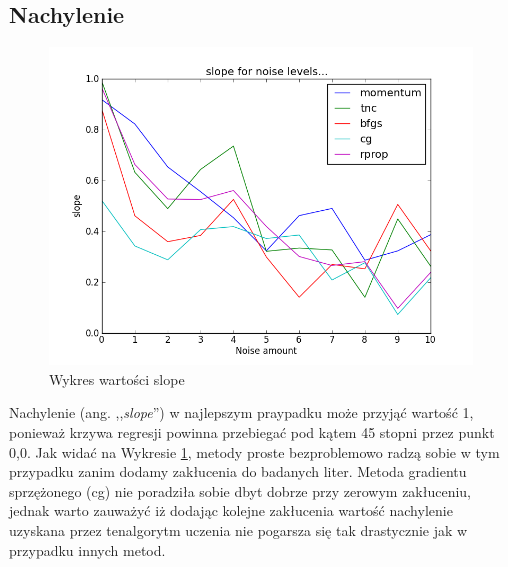 \documentclass[a4paper]{article}
\begin{document}
\subsection{Nachylenie}
\begin{figure}[pht]
 \centering
 \includegraphics[scale=0.5]{../compare_plots/compare_plot_slope}
 \caption{Wykres wartości slope}\label{rys:plot1}
\end{figure}
Nachylenie (ang. ,,\textit{slope}'') w najlepszym praypadku może przyjąć wartość 1, ponieważ krzywa regresji 
powinna przebiegać pod kątem 45 stopni przez punkt 0,0. Jak widać na Wykresie \ref{rys:plot1},
metody proste bezproblemowo radzą sobie w tym przypadku zanim dodamy zakłucenia do badanych liter.
Metoda gradientu sprzężonego (cg) nie poradziła sobie dbyt dobrze przy zerowym zakłuceniu, jednak warto 
zauważyć iż dodając kolejne zakłucenia wartość nachylenie uzyskana przez tenalgorytm uczenia nie pogarsza się tak drastycznie 
jak w przypadku innych metod.
\end{document}
